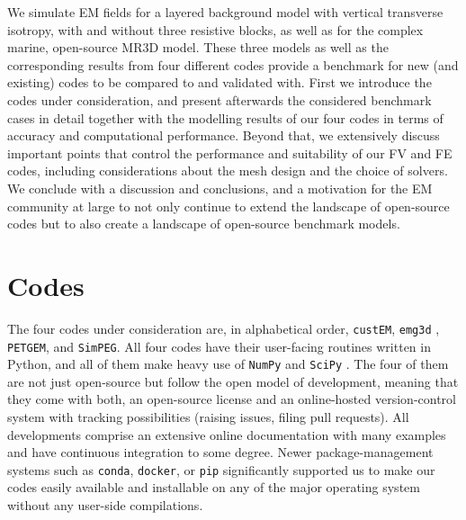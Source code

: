 \documentclass[
    paper,
  ]{geophysics}
\newcommand{\emg}[2]{\texttt{emg#1#2}\xspace}
\newcommand{\simpeg}{\texttt{SimPEG}\xspace}
\newcommand{\custem}{\texttt{custEM}\xspace}
\newcommand{\petgem}{\texttt{PETGEM}\xspace}
\begin{document}
We simulate EM fields for a layered background model with vertical transverse isotropy, with and without three resistive blocks, as well as for the complex marine, open-source MR3D model. These three models as well as the corresponding results from four different codes provide a benchmark for new (and existing) codes to be compared to and validated with. First we introduce the codes under consideration, and present afterwards the considered benchmark cases in detail together with the modelling results of our four codes in terms of accuracy and computational performance. Beyond that, we extensively discuss important points that control the performance and suitability of our FV and FE codes, including considerations about the mesh design and the choice of solvers. We conclude with a discussion and conclusions, and a motivation for the EM community at large to not only continue to extend the landscape of open-source codes but to also create a landscape of open-source benchmark models.

\section{Codes}

The four codes under consideration are, in alphabetical order, \custem \citep{GEO.19.Rochlitz}, \emg3d \citep{JOSS.19.Werthmuller}, \petgem \citep{CAG.18.CastilloReyes, GJI.19.CastilloReyes}, and \simpeg \citep{CAG.15.Cockett, CAG.17.Heagy}. All four codes have their user-facing routines written in Python, and all of them make heavy use of \texttt{NumPy} \citep{NAT.20.Harris} and \texttt{SciPy} \citep{NM.20.Virtanen}. The four of them are not just open-source but follow the open model of development, meaning that they come with both, an open-source license and an online-hosted version-control system with tracking possibilities (raising issues, filing pull requests). All developments comprise an extensive online documentation with many examples and have continuous integration to some degree. Newer package-management systems such as \texttt{conda}, \texttt{docker}, or \texttt{pip} significantly supported us to make our codes easily available and installable on any of the major operating system without any user-side compilations.
\end{document}
